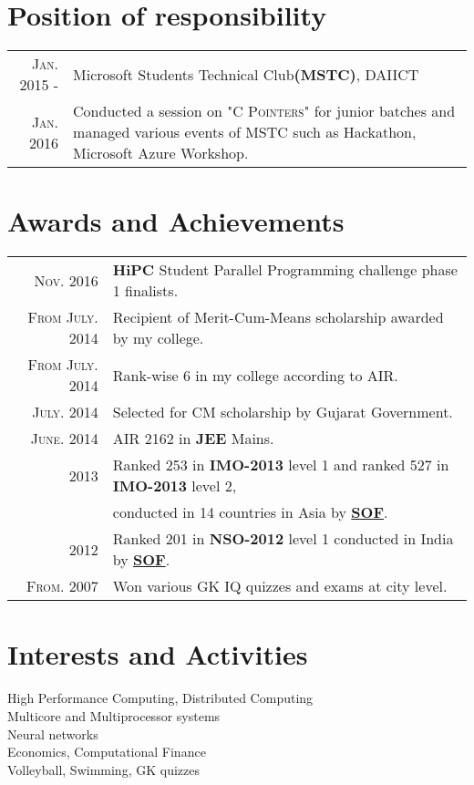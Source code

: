 \documentclass[a4paper,10pt]{article}
\begin{document}
\section{Position of responsibility}
\begin{tabular}{r|p{11cm}}
    \textsc{Jan. 2015 -} & Microsoft Students Technical Club\textbf{(MSTC)}, DAIICT\\
    \textsc{Jan. 2016} &\footnotesize{Conducted a session on \textsc{"C Pointers"} for junior batches and managed various events of MSTC such as Hackathon, Microsoft Azure Workshop.}
\end{tabular}



\section{Awards and Achievements}
\begin{tabular}{rl}
    \textsc{Nov.} 2016 & \textbf{HiPC} Student Parallel Programming challenge phase 1 finalists.\\
    \textsc{From July.} 2014 & Recipient of Merit-Cum-Means scholarship awarded by my college. \\
    \textsc{From July.} 2014 & Rank-wise 6 in my college according to AIR. \\
    \textsc{July.} 2014 & Selected for CM scholarship by Gujarat Government. \\
    \textsc{June.} 2014 & AIR 2162 in \textbf{JEE} Mains. \\
    2013 & Ranked 253 in \textbf{IMO-2013} level 1 and ranked 527 in \textbf{IMO-2013} level 2, \\
    & conducted in 14 countries in Asia by \href{www.sofworld.org}{\textbf{SOF}}.\\
    2012 & Ranked 201 in \textbf{NSO-2012} level 1 conducted in India by \href{www.sofworld.org}{\textbf{SOF}}. \\
    \textsc{From.} 2007 & Won various GK IQ quizzes and exams at city level.
\end{tabular}



\section{Interests and Activities}
High Performance Computing, Distributed Computing \\
Multicore and Multiprocessor systems\\
Neural networks\\
Economics, Computational Finance\\
Volleyball, Swimming, GK quizzes


\thispagestyle{fancy}
\fancyhead{}
\fancyfoot{}
\renewcommand{\headrulewidth}{0pt}
\end{document}
